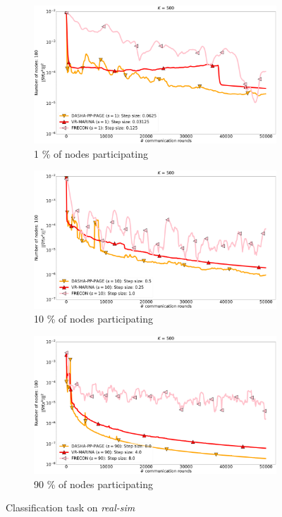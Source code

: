 \documentclass[10pt]{article}
\begin{document}
\begin{figure}[H]
    \begin{subfigure}{.33\textwidth}
        \includegraphics[width=\textwidth]{neurips_2022_finite_sum_real-sim_nof_500_numnodes_100_more_probs_batch_size_1_frecon_number_of_workers_1.pdf}
        \caption{1 \% of nodes participating}
    \end{subfigure}
    \begin{subfigure}{.33\textwidth}
        \includegraphics[width=\textwidth]{neurips_2022_finite_sum_real-sim_nof_500_numnodes_100_more_probs_batch_size_1_frecon_number_of_workers_10.pdf}
        \caption{10 \% of nodes participating}
    \end{subfigure}
    \begin{subfigure}{.33\textwidth}
        \includegraphics[width=\textwidth]{neurips_2022_finite_sum_real-sim_nof_500_numnodes_100_more_probs_batch_size_1_frecon_number_of_workers_90.pdf}
        \caption{90 \% of nodes participating}
    \end{subfigure}
\caption{Classification task on \textit{real-sim}}
\label{fig:finite-sum-real-sim}
\end{figure}
\end{document}
